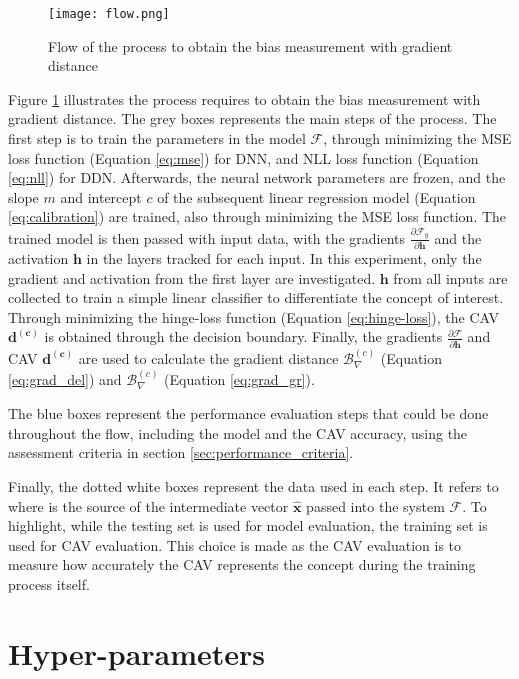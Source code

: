\begin{figure}[H]
  \centering
  \texttt{[image: flow.png]}
  \caption{Flow of the process to obtain the bias measurement with gradient distance}
  \label{fig:flow}
\end{figure}

Figure \ref{fig:flow} illustrates the process requires to obtain the bias measurement with gradient distance. The grey boxes represents the main steps of the process. The first step is to train the parameters in the model $\mathcal{F}$, through minimizing the MSE loss function (Equation \ref{eq:mse}) for DNN, and NLL loss function (Equation \ref{eq:nll}) for DDN. Afterwards, the neural network parameters are frozen, and the slope $m$ and intercept $c$ of the subsequent linear regression model (Equation \ref{eq:calibration}) are trained, also through minimizing the MSE loss function. The trained model is then passed with input data, with the gradients $\frac{\partial \mathcal{F}_y}{\partial \boldsymbol{h}}$ and the activation $\boldsymbol{h}$ in the layers tracked for each input. In this experiment, only the gradient and activation from the first layer are investigated. $\boldsymbol{h}$ from all inputs are collected to train a simple linear classifier to differentiate the concept of interest. Through minimizing the hinge-loss function (Equation \ref{eq:hinge-loss}), the CAV $\boldsymbol{d^{(c)}}$ is obtained through the decision boundary. Finally, the gradients $\frac{\partial \mathcal{F}}{\partial \boldsymbol{h}}$ and CAV $\boldsymbol{d^{(c)}}$ are used to calculate the gradient distance $\mathcal{B}^{(c)}_{\nabla}$ (Equation \ref{eq:grad_del}) and $\mathcal{B}^{(c)}_{\nabla}$ (Equation \ref{eq:grad_gr}).

The blue boxes represent the performance evaluation steps that could be done throughout the flow, including the model and the CAV accuracy, using the assessment criteria in section \ref{sec:performance_criteria}.

Finally, the dotted white boxes represent the data used in each step. It refers to where is the source of the intermediate vector $\mathbf{\hat{x}}$ passed into the system $\mathcal{F}$. To highlight, while the testing set is used for model evaluation, the training set is used for CAV evaluation. This choice is made as the CAV evaluation is to measure how accurately the CAV represents the concept during the training process itself.

\section{Hyper-parameters}
